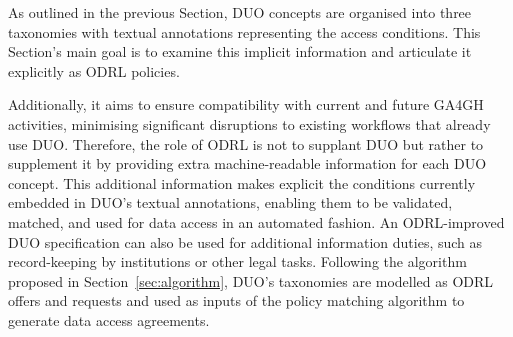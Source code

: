 As outlined in the previous Section, DUO concepts are organised into three taxonomies with textual annotations representing the access conditions.
This Section's main goal is to examine this implicit information and articulate it explicitly as ODRL policies.

Additionally, it aims to ensure compatibility with current and future GA4GH activities, minimising significant disruptions to existing workflows that already use DUO.
Therefore, the role of ODRL is not to supplant DUO but rather to supplement it by providing extra machine-readable information for each DUO concept.
This additional information makes explicit the conditions currently embedded in DUO's textual annotations, enabling them to be validated, matched, and used for data access in an automated fashion.
An ODRL-improved DUO specification can also be used for additional information duties, such as record-keeping by institutions or other legal tasks.
Following the algorithm proposed in Section~\ref{sec:algorithm}, DUO's taxonomies are modelled as ODRL offers and requests and used as inputs of the policy matching algorithm to generate data access agreements.



